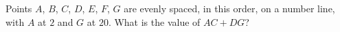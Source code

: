 Points $A$, $B$, $C$, $D$, $E$, $F$, $G$ are evenly spaced, in this order, on a number line, with $A$ at $2$ and $G$ at $20$. What is the value of $AC+DG$?
